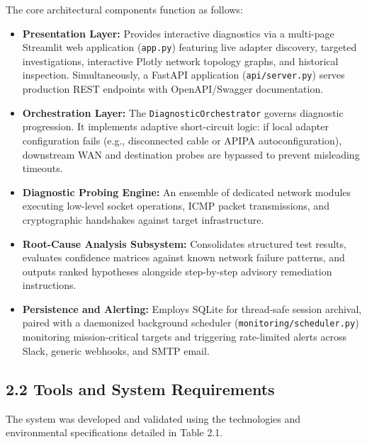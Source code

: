\documentclass[
]{article}
\providecommand{\tightlist}{%
  \setlength{\itemsep}{0pt}\setlength{\parskip}{0pt}}
\begin{document}
The core architectural components function as follows:
\begin{itemize}
\tightlist
\item \textbf{Presentation Layer:} Provides interactive diagnostics via a multi-page Streamlit web application (\texttt{app.py}) featuring live adapter discovery, targeted investigations, interactive Plotly network topology graphs, and historical inspection. Simultaneously, a FastAPI application (\texttt{api/server.py}) serves production REST endpoints with OpenAPI/Swagger documentation.
\item \textbf{Orchestration Layer:} The \texttt{DiagnosticOrchestrator} governs diagnostic progression. It implements adaptive short-circuit logic: if local adapter configuration fails (e.g., disconnected cable or APIPA autoconfiguration), downstream WAN and destination probes are bypassed to prevent misleading timeouts.
\item \textbf{Diagnostic Probing Engine:} An ensemble of dedicated network modules executing low-level socket operations, ICMP packet transmissions, and cryptographic handshakes against target infrastructure.
\item \textbf{Root-Cause Analysis Subsystem:} Consolidates structured test results, evaluates confidence matrices against known network failure patterns, and outputs ranked hypotheses alongside step-by-step advisory remediation instructions.
\item \textbf{Persistence and Alerting:} Employs SQLite for thread-safe session archival, paired with a daemonized background scheduler (\texttt{monitoring/scheduler.py}) monitoring mission-critical targets and triggering rate-limited alerts across Slack, generic webhooks, and SMTP email.
\end{itemize}

\subsection{2.2 Tools and System Requirements}\label{tools-and-system-requirements}

The system was developed and validated using the technologies and environmental specifications detailed in Table 2.1.
\end{document}
